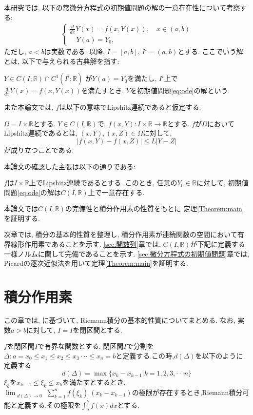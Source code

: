 \documentclass[12pt,xelatex,ja=standard]{bxjsarticle}
\begin{document}
本研究では, 以下の常微分方程式の初期値問題の解の一意存在性について考察する:
	\begin{align}
	\begin{cases}
	\frac{d}{dx}Y(x) = f(x, Y(x)), \quad x \in (a,b)\\
	\quad Y(a) = Y_{0},
	\end{cases}
	\label{eq:ode}
	\end{align}
ただし, $a < b$は実数である.
以降, $I = [a,b]$, $I^i=(a,b)$とする.
ここでいう解とは, 以下で与えられる古典解を指す:
\begin{Definition}
$Y ∈ C(I;\mathbb R) \cap C^1(I^i;\mathbb R)$
が$Y(a) = Y_0$を満たし,
$I^i$上で$\frac{d}{dx}Y(x) = f(x, Y(x))$を満たすとき,
$Y$を初期値問題\eqref{eq:ode}の解という.
\end{Definition}
また本論文では,
$f$は以下の意味でLipshitz連続であると仮定する.
\begin{Definition}[Lipshitz条件]
$\Omega=I\times \mathbb{R}$とする.
$Y \in C(I,\mathbb{R})$で,
$f(x,Y): I \times \mathbb{R} \to \mathbb{R}$とする.
$f$が$\Omega$においてLipshitz連続であるとは,
$(x,Y), (x,Z) \in \Omega$に対して,
	\[
	|f(x, Y) - f(x, Z)| \leq L |Y - Z|
	\]
が成り立つことである.
\end{Definition}
本論文の確認した主張は以下の通りである:
\begin{Theorem}
\label{Theorem:main}
$f$は$I \times \mathbb R$上でLipshitz連続であるとする.
このとき,
任意の$Y_{0} \in \mathbb{R}$に対して,
初期値問題\eqref{eq:ode}の解は$C(I,\mathbb{R})$上で一意存在する.
\end{Theorem}

本論文では$C(I,\mathbb{R})$の完備性と積分作用素の性質をもとに
定理\ref{Theorem:main}を証明する.

次章では,
積分の基本的性質を整理し, 積分作用素が連続関数の空間において有界線形作用素であることを示す.
\ref{sec:関数列}章では,
$C(I,\mathbb{R})$が下記に定義する一様ノルムに関して完備であることを示す.
\ref{sec:微分方程式の初期値問題}章では,
Picardの逐次近似法を用いて定理\ref{Theorem:main}を証明する.

\section{積分作用素}
\label{sec:積分作用素}
この章では,
\cite{R1,R2}に基づいて,
Riemann積分の基本的性質についてまとめる.
なお, 実数$a>b$に対して, $I=I$を閉区間とする.

\begin{Definition}[Riemann積分]
$f$を閉区間$I$で有界な関数とする.
閉区間$I$で分割を$\Delta:a=x_{0}\leq x_{1} \leq x_{2} \leq x_{3} \cdot \cdot \cdot  \leq x_{n}=b$と定義する.この時,$d(\Delta)$を以下のように定義する
\[d(\Delta)=\max\{x_{k}-x_{k-1}|k=1,2,3,\cdot \cdot\cdot n \}\]
$\xi_{k}$を$x_{k-1} \leq \xi_{k}\leq x_{k}$を満たすとするとき,
$\displaystyle \lim_{\substack{d(\Delta) \to 0}} \sum_{k=1}^{n} f(\xi_{k}) \ (x_k - x_{k-1})$の極限が存在するとき,Riemann積分可能と定義する.その極限を$\displaystyle \int_{a}^{b} f(x) dx$とする.
\end{Definition}
\end{document}
